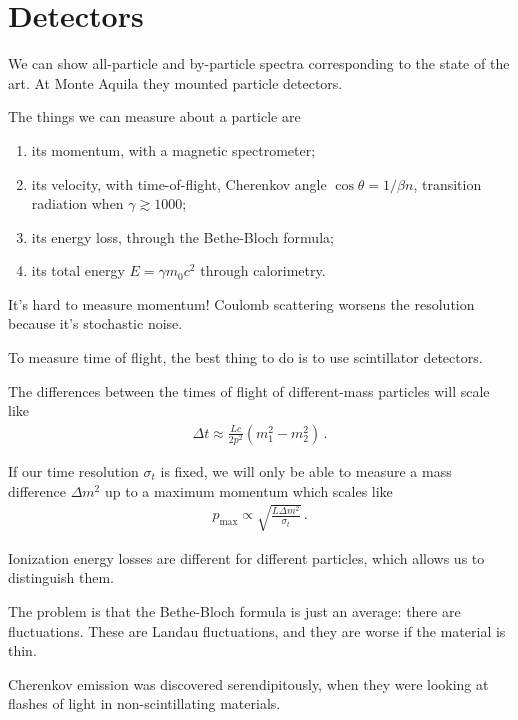 \documentclass[main.tex]{subfiles}
\begin{document}
\section{Detectors}


We can show all-particle and by-particle spectra corresponding to the state of the art. 
At Monte Aquila they mounted particle detectors. 

The things we can measure about a particle are
\begin{enumerate}
    \item its momentum, with a  magnetic spectrometer;
    \item its velocity, with time-of-flight, Cherenkov angle \(\cos \theta = 1 / \beta n\), transition radiation when \(\gamma \gtrsim 1000\);
    \item its energy loss, through the Bethe-Bloch formula;
    \item its total energy \(E = \gamma m_0 c^2\) through calorimetry.
\end{enumerate}

It's hard to measure momentum! 
Coulomb scattering worsens the resolution because it's stochastic noise. 

To measure time of flight, the best thing to do is to use scintillator detectors. 

The differences between the times of flight of different-mass particles 
will scale like 
%
\begin{align}
\Delta t \approx \frac{Lc}{2 p^2} (m_1^2 - m_2^2)
\,.
\end{align}

If our time resolution \(\sigma _t\) is fixed, we will only be able to measure
a mass difference \(\Delta m^2\) up to a maximum momentum which scales like 
%
\begin{align}
p _{\text{max}} \propto \sqrt{\frac{L \Delta m^2}{\sigma _t}}
\,.
\end{align}

Ionization energy losses are different for different particles, 
which allows us to distinguish them. 

The problem is that the Bethe-Bloch formula is just an average: 
there are fluctuations. 
These are Landau fluctuations, and they are worse if the material is thin.

Cherenkov emission was discovered serendipitously, 
when they were looking at flashes of light in non-scintillating materials. 
\end{document}

